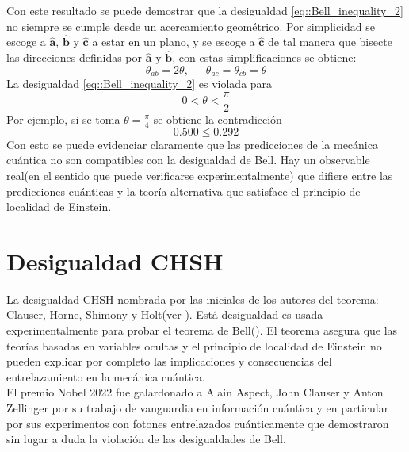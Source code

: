 \documentclass[a4paper]{article}
\begin{document}
Con este resultado se puede demostrar que la desigualdad \ref{eq::Bell_inequality_2} no siempre se cumple desde un acercamiento geométrico. Por simplicidad se escoge a $\mathbf{\hat{a}}$, $\mathbf{\hat{b}}$ y $\mathbf{\hat{c}}$ a estar en un plano, y se escoge a $\mathbf{\hat{c}}$ de tal manera que bisecte las direcciones definidas por $\mathbf{\hat{a}}$ y $\mathbf{\hat{b}}$, con estas simplificaciones se obtiene:
\begin{equation}
\theta_{ab}=2\theta,\,\,\,\,\,\,\,\,\, \theta_{ac}=\theta_{cb}=\theta
\end{equation}
La desigualdad \ref{eq::Bell_inequality_2} es violada para
\begin{equation}
0<\theta<\frac{\pi}{2}
\end{equation}
Por ejemplo, si se toma $\theta=\frac{\pi}{4}$ se obtiene la contradicción
\begin{equation}
0.500\leq 0.292
\end{equation}
Con esto se puede evidenciar claramente que las predicciones de la mecánica cuántica no son compatibles con la desigualdad de Bell. Hay un observable real(en el sentido que puede verificarse experimentalmente) que difiere entre las predicciones cuánticas y la teoría alternativa que satisface el principio de localidad de Einstein.

\section{Desigualdad CHSH}
La desigualdad CHSH nombrada por las iniciales de los autores del teorema: Clauser, Horne, Shimony y Holt(ver \cite{Clauser}). Está desigualdad es usada experimentalmente para probar el teorema de Bell(\cite{Bell}). El teorema asegura que las teorías basadas en variables ocultas y el principio de localidad de Einstein no pueden explicar por completo las implicaciones y consecuencias del entrelazamiento en la mecánica cuántica.\\

El premio Nobel 2022 fue galardonado a Alain Aspect, John Clauser y Anton Zellinger por su trabajo de vanguardia en información cuántica y en particular por sus experimentos con fotones entrelazados cuánticamente que demostraron sin lugar a duda la violación de las desigualdades de Bell.\\
\end{document}
